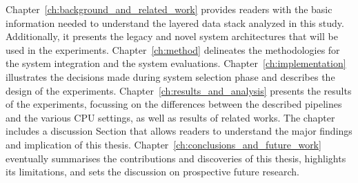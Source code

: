 Chapter~\ref{ch:background_and_related_work} provides readers with the basic information needed to understand the layered data stack analyzed in this study. Additionally, it presents the legacy and novel system architectures that will be used in the experiments. Chapter~\ref{ch:method} delineates the methodologies for the system integration and the system evaluations. Chapter~\ref{ch:implementation} illustrates the decisions made during system selection phase and describes the design of the experiments. Chapter~\ref{ch:results_and_analysis} presents the results of the experiments, focussing on the differences between the described pipelines and the various \gls{CPU} settings, as well as results of related works. The chapter includes a discussion Section that allows readers to understand the major findings and implication of this thesis. Chapter~\ref{ch:conclusions_and_future_work} eventually summarises the contributions and discoveries of this thesis, highlights its limitations, and sets the discussion on prospective future research.